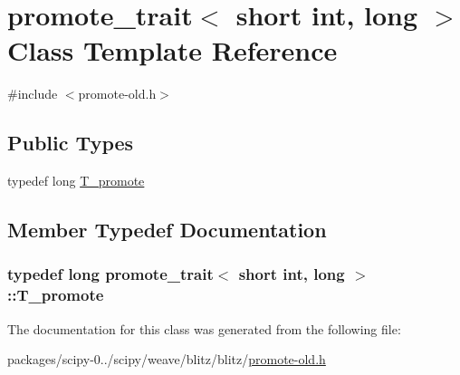 \hypertarget{classpromote__trait_3_01short_01int_00_01long_01_4}{}\section{promote\+\_\+trait$<$ short int, long $>$ Class Template Reference}
\label{classpromote__trait_3_01short_01int_00_01long_01_4}


{\ttfamily \#include $<$promote-\/old.\+h$>$}

\subsection*{Public Types}
\begin{DoxyCompactItemize}
\item 
typedef long \hyperlink{classpromote__trait_3_01short_01int_00_01long_01_4_a2abfa5a2b96d28d6319aa4ce9d2e30e8}{T\+\_\+promote}
\end{DoxyCompactItemize}


\subsection{Member Typedef Documentation}
\hypertarget{classpromote__trait_3_01short_01int_00_01long_01_4_a2abfa5a2b96d28d6319aa4ce9d2e30e8}{}
\subsubsection[{T\+\_\+promote}]{\setlength{\rightskip}{0pt plus 5cm}typedef long {\bf promote\+\_\+trait}$<$ short int, long $>$\+::{\bf T\+\_\+promote}}\label{classpromote__trait_3_01short_01int_00_01long_01_4_a2abfa5a2b96d28d6319aa4ce9d2e30e8}


The documentation for this class was generated from the following file\+:\begin{DoxyCompactItemize}
\item 
packages/scipy-\/0../scipy/weave/blitz/blitz/\hyperlink{promote-old_8h}{promote-\/old.\+h}\end{DoxyCompactItemize}
